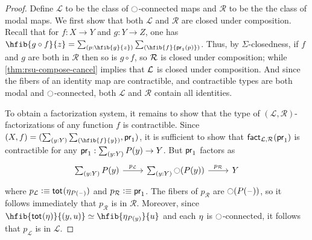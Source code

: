 \begin{proof}
Define $\mathcal{L}$ to be the class of $\modal$-connected
maps and $\mathcal{R}$ to be the the class of modal maps.
We first show that both $\mathcal{L}$ and $\mathcal{R}$ are closed under
composition. Recall that for $f:X\to Y$ and $g:Y\to Z$, one has
$\hfib{g\circ f}{z}=\sm{p:\hfib{g}{z}}\hfib{f}{\proj1(p)}$.
Thus, by $\Sigma$-closedness, if $f$ and $g$ are both in $\mathcal{R}$ then so is $g\circ f$, so $\cR$ is closed under composition; while \cref{thm:rsu-compose-cancel} implies that $\cL$ is closed under composition.
And since the fibers of an identity map are contractible, and contractible types are both modal and $\modal$-connected, both $\mathcal{L}$ and $\mathcal{R}$ contain all identities.


To obtain a factorization system,
it remains to show that the type of
$(\mathcal{L},\mathcal{R})$-factorizations of any function $f$ is contractible.
Since $\pairr{X,f}=\pairr{\sm{y:Y}\hfib{f}{y},\proj1}$, it is sufficient to
show that $\fact_{\mathcal{L},\mathcal{R}}(\proj1)$ is contractible for any
$\proj1:\sm{y:Y}P(y)\to Y$. But $\proj1$ factors as
\begin{equation*}
\begin{tikzcd}
\sm{y:Y}P(y) \arrow[r,"p_\mathcal{L}"] & \sm{y:Y}\modal(P(y)) \arrow[r,"p_\mathcal{R}"] & Y
\end{tikzcd}
\end{equation*}
where $p_\mathcal{L}\defeq\total{\modalunit[P(\blank)]}$ and $p_\mathcal{R}\defeq\proj1$.
The fibers of $p_\mathcal{R}$ are $\modal(P(\blank))$, so it follows
immediately that $p_\mathcal{R}$ is in $\mathcal{R}$.
Moreover, since
$\eqv{\hfib{\total{\modalunit}}{\pairr{y,u}}}{\hfib{\modalunit[P(y)]}{u}}$ and each $\modalunit$ is $\modal$-connected, it follows that $p_\mathcal{L}$ is in
$\mathcal{L}$.


\end{proof}
